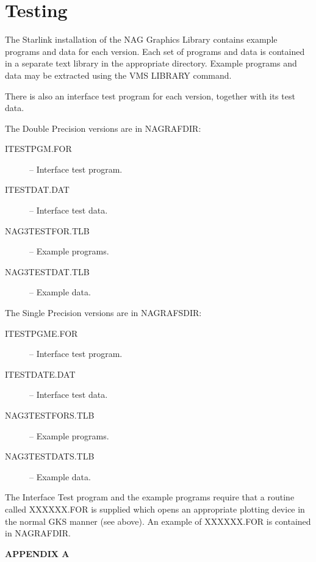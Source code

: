 \section{Testing}
The Starlink installation of the NAG Graphics Library contains example programs
and data for each version. Each set of programs and data is contained in a
separate text library in the appropriate directory. Example programs and data
may be extracted using the VMS LIBRARY command.

There is also an interface test program for each version, together with its
test data.

The Double Precision versions are in NAGRAFDIR:
\begin{description}
\begin{description}
\item[ITESTPGM.FOR] -- Interface test program.
\item[ITESTDAT.DAT] -- Interface test data.
\item[NAG3TESTFOR.TLB] -- Example programs.
\item[NAG3TESTDAT.TLB] -- Example data.
\end{description}
\end{description}

The Single Precision versions are in NAGRAFSDIR:
\begin{description}
\begin{description}
\item[ITESTPGME.FOR] -- Interface test program.
\item[ITESTDATE.DAT] -- Interface test data.
\item[NAG3TESTFORS.TLB] -- Example programs.
\item[NAG3TESTDATS.TLB] -- Example data.
\end{description}
\end{description}

The Interface Test program and the example programs require that a routine
called XXXXXX.FOR is supplied which opens an appropriate plotting device in the
normal GKS manner (see above). An example of XXXXXX.FOR is contained in
NAGRAFDIR.

\newpage
\begin{center}
{\bf APPENDIX A}
\end {center}


